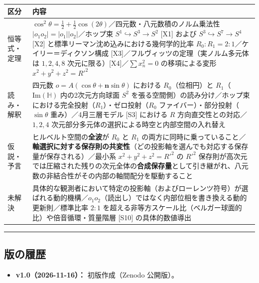 \documentclass[
  a4paper,
]{ltjsarticle}
\newcounter{none} %
\providecommand{\tightlist}{%
  \setlength{\itemsep}{0pt}\setlength{\parskip}{0pt}}
\begin{document}
{\def\LTcaptype{none} %
\begin{longtable}[]{@{}
  >{\raggedright\arraybackslash}p{}
  >{\raggedright\arraybackslash}p{}@{}}
\toprule\noalign{}
\begin{minipage}[b]{\linewidth}\raggedright
区分
\end{minipage} & \begin{minipage}[b]{\linewidth}\raggedright
内容
\end{minipage} \\
\midrule\noalign{}
\endhead
\bottomrule\noalign{}
\endlastfoot
恒等式・定理 &
\(\cos^2\theta = \frac{1}{2} + \frac{1}{2}\cos(2\theta)\)／四元数・八元数積のノルム乗法性
\(|o_1 o_2| = |o_1||o_2|\)／ホップ束 \(S^1 \hookrightarrow S^3 \to S^2\)
{[}X1{]} および \(S^3 \hookrightarrow S^7 \to S^4\) {[}X2{]}
と標準リーマン沈め込みにおける幾何学的比率
\(R_0 : R_1 = 2 : 1\)／ケイリー＝ディクソン構成
{[}X3{]}／フルヴィッツの定理（実ノルム多元体は \(1, 2, 4, 8\)
次元に限る）{[}X4{]}／\(\sum x_n^2 = 0\) の移項による変形
\(x^2+y^2+z^2 = R'^2\) \\
読み・解釈 & 四元数 \(o = A(\cos\theta + \mathbf{n}\sin\theta)\)
における \(R_0\)（位相円）と \(R_1\)（\(\mathrm{Im}(\mathbb{H})\)
内の2次元方向球面 \(S^2\)
を張る空間側）の読み分け／ホップ束における完全投射（\(R_1\)）・ゼロ投射（\(R_0\)
ファイバー）・部分投射（\(\sin\theta\) 重み）／4月三層モデル {[}S3{]}
における \(R\) 方向直交性との対応／\(1, 2, 4\)
次元部分多元体の選択による時空と内部空間の入れ替え \\
仮説・予言 & ヒルベルト空間の\textbf{全波}が \(R_0\) と \(R_1\)
の両方に同時に乗っていること／\textbf{軸選択に対する保存則の共変性}（どの投影軸を選んでも対応する保存量が保存される）／最小系
\(x^2+y^2+z^2=R'^2\) の \(R'^2\)
保存則が高次元では圧縮された残りの次元全体の\textbf{合成保存量}として引き継がれ、八元数の非結合性がその内部の軸間配分を駆動すること \\
未解決 &
具体的な観測者において特定の投影軸（およびローレンツ符号）が選ばれる動的機構／\(o_1 o_2\)（読出し）ではなく内部位相を書き換える動的更新則／標準比率
\(2:1\) を超える非等方スケール比（ベルガー球面的比）や倍音循環・質量階層
{[}S10{]} の具体的数値導出 \\
\end{longtable}
}

\begin{center}\rule{0.5\linewidth}{0.5pt}\end{center}

\subsection{版の履歴}\label{ux7248ux306eux5c65ux6b74}

\begin{itemize}
\tightlist
\item
  \textbf{v1.0（2026-11-16）：} 初版作成（Zenodo 公開版）。
\end{itemize}
\end{document}
